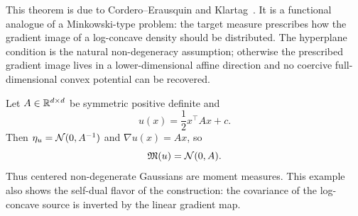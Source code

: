 This theorem is due to Cordero--Erausquin and Klartag~\cite{CorderoErausquinKlartag2015MomentMeasures}. It is a functional analogue of a Minkowski-type problem: the target measure prescribes how the gradient image of a log-concave density should be distributed. The hyperplane condition is the natural non-degeneracy assumption; otherwise the prescribed gradient image lives in a lower-dimensional affine direction and no coercive full-dimensional convex potential can be recovered.

\begin{example}\label{ex-moment-measure-gaussian}
	Let $A\in\mathbb{R}^{d\times d}$ be symmetric positive definite and
	\[
		u(x)=\frac12 x^\top A x + c.
	\]
	Then $\eta_u=\mathcal{N}(0,A^{-1})$ and $\nabla u(x)=Ax$, so
	\[
		\mathfrak M(u)=\mathcal{N}(0,A).
	\]
	Thus centered non-degenerate Gaussians are moment measures. This example also shows the self-dual flavor of the construction: the covariance of the log-concave source is inverted by the linear gradient map.
\end{example}


